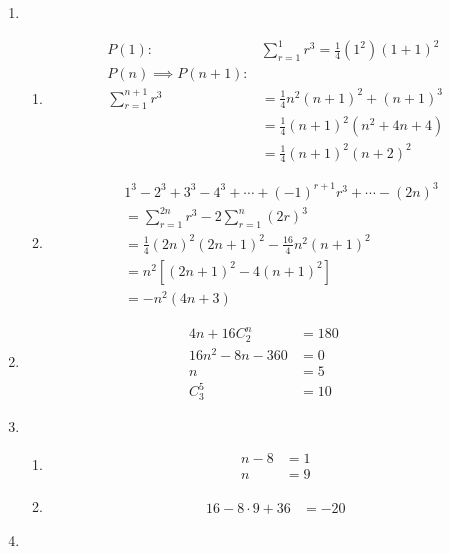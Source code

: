 \documentclass[12pt]{article}
\begin{document}
    \begin{enumerate}
        \item \begin{enumerate}
            \item \begin{align*}
                P(1):&\sum_{r=1}^1 r^3=\frac{1}{4}(1^2)(1+1)^2\\
                P(n)\implies P(n+1):&\\
                \sum_{r=1}^{n+1}r^3&=\frac{1}{4}n^2(n+1)^2+(n+1)^3\\
                &=\frac{1}{4}(n+1)^2(n^2+4n+4)\\
                &=\frac{1}{4}(n+1)^2(n+2)^2
            \end{align*}
            \item \begin{align*}
                &1^3-2^3+3^3-4^3+\cdots+(-1)^{r+1}r^3+\cdots-(2n)^3\\
                &=\sum_{r=1}^{2n}r^3-2\sum_{r=1}^n(2r)^3\\
                &=\frac{1}{4}(2n)^2(2n+1)^2-\frac{16}{4}n^2(n+1)^2\\
                &=n^2[(2n+1)^2-4(n+1)^2]\\
                &=-n^2(4n+3)
            \end{align*}
        \end{enumerate}
        \item \begin{align*}
            4n+16C_2^n&=180\\
            16n^2-8n-360&=0\\
            n&=5\\
            C_3^5&=10
        \end{align*}
        \item \begin{enumerate}
            \item \begin{align*}
                n-8&=1\\
                n&=9
            \end{align*}
            \item \begin{align*}
                16-8\cdot9+36&=-20
            \end{align*}
        \end{enumerate}
        \item \begin{enumerate}

\end{enumerate}
\end{enumerate}
\end{document}
